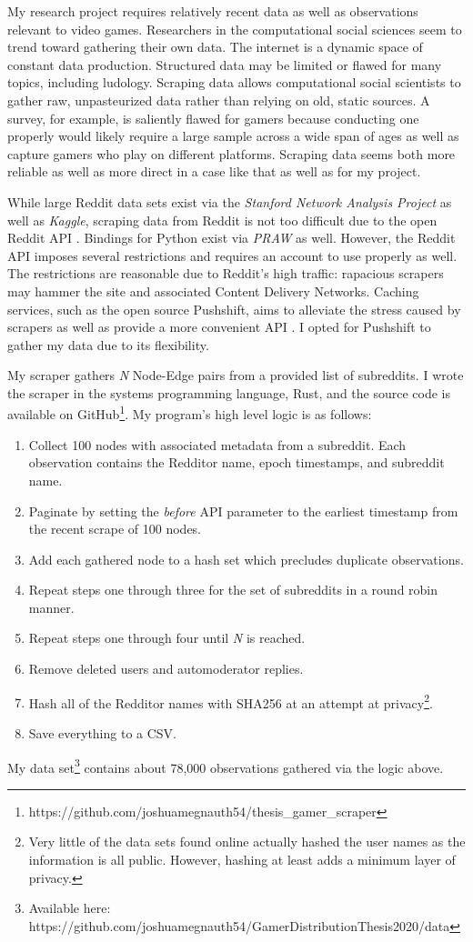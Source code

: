 \documentclass[12pt, a4paper]{article}
\begin{document}
My research project requires relatively recent data as well as observations relevant to video games. Researchers in the computational social sciences seem to trend toward gathering their own data. The internet is a dynamic space of constant data production. Structured data may be limited or flawed for many topics, including ludology. Scraping data allows computational social scientists to gather raw, unpasteurized data rather than relying on old, static sources. A survey, for example, is saliently flawed for gamers because conducting one properly would likely require a large sample across a wide span of ages as well as capture gamers who play on different platforms. Scraping data seems both more reliable as well as more direct in a case like that as well as for my project.

While large Reddit data sets exist via the \textit{Stanford Network Analysis Project} as well as \textit{Kaggle}, scraping data from Reddit is not too difficult due to the open Reddit API \cite{redditapi}. Bindings for Python exist via \textit{PRAW} as well. However, the Reddit API imposes several restrictions and requires an account to use properly as well. The restrictions are reasonable due to Reddit's high traffic: rapacious scrapers may hammer the site and associated Content Delivery Networks. Caching services, such as the open source Pushshift, aims to alleviate the stress caused by scrapers as well as provide a more convenient API \cite{pushshiftapi}. I opted for Pushshift to gather my data due to its flexibility.

My scraper gathers \textit{N} Node-Edge pairs from a provided list of subreddits. I wrote the scraper in the systems programming language, Rust, and the source code is available on GitHub\footnote{https://github.com/joshuamegnauth54/thesis\_gamer\_scraper}. My program's high level logic is as follows: 

\begin{enumerate}
  \item Collect 100 nodes with associated metadata from a subreddit. Each observation contains the Redditor name, epoch timestamps, and subreddit name.
  \item Paginate by setting the \textit{before} API parameter to the earliest timestamp from the recent scrape of 100 nodes.
  \item Add each gathered node to a hash set which precludes duplicate observations.
  \item Repeat steps one through three for the set of subreddits in a round robin manner.
  \item Repeat steps one through four until \textit{N} is reached.
  \item Remove deleted users and automoderator replies.
  \item Hash all of the Redditor names with SHA256 at an attempt at privacy\footnote{Very little of the data sets found online actually hashed the user names as the information is all public. However, hashing at least adds a minimum layer of privacy.}.
  \item Save everything to a CSV.
\end{enumerate}

My data set\footnote{Available here: https://github.com/joshuamegnauth54/GamerDistributionThesis2020/data} contains about 78,000 observations gathered via the logic above.

\printbibliography
\end{document}

